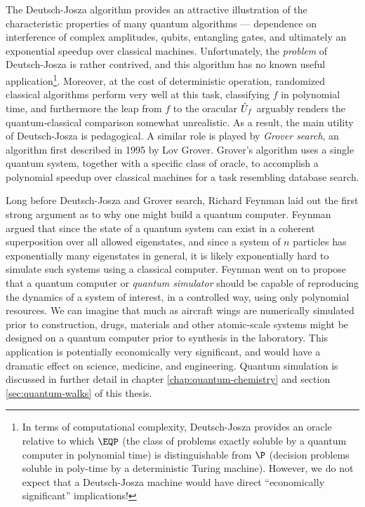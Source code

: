 The Deutsch-Josza algorithm provides an attractive illustration of the characteristic properties of many quantum algorithms --- dependence on interference of complex amplitudes, qubits, entangling gates, and ultimately an exponential speedup over classical machines. Unfortunately, the \emph{problem} of Deutsch-Josza is rather contrived, and this algorithm has no known useful application\footnote{In terms of computational complexity, Deutsch-Josza provides an oracle relative to which $\EQP$ (the class of problems exactly soluble by a quantum computer in polynomial time) is distinguishable from $\P$ (decision problems soluble in poly-time by a deterministic Turing machine). However, we do not expect that a Deutsch-Josza machine would have direct ``economically significant'' implications!}.
Moreover, at the cost of deterministic operation, randomized classical algorithms perform very well at this task, classifying $f$ in polynomial time, and furthermore the leap from $f$ to the oracular $\hat{U}_f$ arguably renders the quantum-classical comparison somewhat unrealistic. As a result, the main utility of Deutsch-Josza is pedagogical.
A similar role is played by \emph{Grover search}, an algorithm first described in 1995 by Lov Grover. Grover's algorithm uses a single quantum system, together with a specific class of oracle, to accomplish a polynomial speedup over classical machines for a task resembling database search.

Long before Deutsch-Josza and Grover search, Richard Feynman \cite{Feynman1982d, Feynman1986} laid out the first strong argument as to why one might build a quantum computer. 
Feynman argued that since the state of a quantum system can exist in a coherent superposition over all allowed eigenstates, and since a system of $n$ particles has exponentially many eigenstates in general, it is likely exponentially hard to simulate such systems using a classical computer. Feynman went on to propose that a quantum computer or \emph{quantum simulator} should be capable of reproducing the dynamics of a system of interest, in a controlled way, using only polynomial resources. We can imagine that much as aircraft wings are numerically simulated prior to construction, drugs, materials and other atomic-scale systems might be designed on a quantum computer prior to synthesis in the laboratory. This application is potentially economically very significant, and would have a dramatic effect on science, medicine, and engineering. Quantum simulation is discussed in further detail in chapter \ref{chap:quantum-chemistry} and section \ref{sec:quantum-walks} of this thesis.

